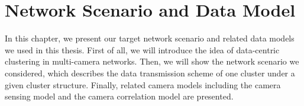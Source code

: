 \section{Network Scenario and Data Model}
\label{sec::scenarioAndModel}
In this chapter, we present our target network scenario and related data models we used in this thesis.
First of all, we will introduce the idea of data-centric clustering in multi-camera networks.
Then, we will show the network scenario we considered, which describes the data transmission scheme of one cluster under a given cluster structure.
Finally, related camera models including the camera sensing model and the camera correlation model are presented.


